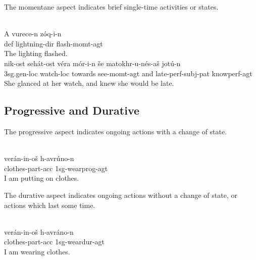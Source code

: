 \documentclass[grammar]{subfiles}
\begin{document}
The momentane aspect indicates brief single-time activities or states.   

\begin{exe}
  \ex {}\\
  \gll A vurece-n zóq-i-n\\
  \acs{def} lightning-\acs{dir} flash-\acs{momt}-\acs{agt}\\
  \glt The lighting flashed. %
  \ex {}\\
  \gll nik-ost sehát-ost véra mór-i-n še matokhr-u-nés-aš jotú-n\\ 
  \acs{3sg}.\acs{gen}-\acs{loc} watch-\acs{loc} towards see-\acs{momt}-\acs{agt} and late-\acs{perf}-\acs{subj}-\acs{pat} know\bs\acs{perf}-\acs{agt}\\
  \glt She glanced at her watch, and knew she would be late.
\end{exe}


\subsection{Progressive and Durative}
\label{vp:ssec_progressive_durative}

The progressive aspect indicates ongoing actions with a change of state.  

\begin{exe}
  \ex\label{ex:vm_putting_on_clothes} \\
  \gll verán-in-oš h-avrúno-n\\
  clothes-\acs{part}-\acs{acc} \acs{1sg}-wear\bs\acs{prog}-\acs{agt}\\
  \glt I am putting on clothes.
\end{exe}

The durative aspect indicates ongoing actions without a change of state, or
actions which last some time.

\begin{exe}
  \ex\label{ex:vm_wearing_clothes} \\
  \gll verán-in-oš h-avráno-n\\
  clothes-\acs{part}-\acs{acc} \acs{1sg}-wear\bs\acs{dur}-\acs{agt}\\
  \glt I am wearing clothes.
\end{exe}
\end{document}
